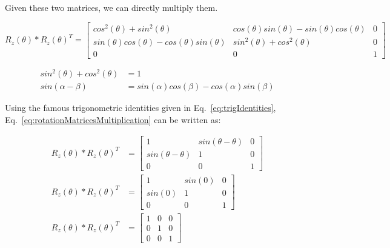 \documentclass[a4paper, twoside, english]{article}
\begin{document}
Given these two matrices, we can directly multiply them.

\begin{equation}
 R_z (\theta) * R_z (\theta)^{T} = \left[
 \begin{array}{ccc}
  cos^2(\theta) + sin^2(\theta) & cos(\theta)sin(\theta) - sin(\theta)cos(\theta) & 0 \\
  sin(\theta)cos(\theta) - cos(\theta)sin(\theta) & sin^2(\theta) + cos^2(\theta) & 0 \\
  0 & 0 & 1
 \end{array}
 \right]
 \label{eq:rotationMatricesMultiplication}
\end{equation}

\begin{equation}
 \begin{aligned}
  sin^2(\theta) + cos^2(\theta) &= 1 \\
          sin(\alpha - \beta) &= sin(\alpha)cos(\beta) - cos(\alpha)sin(\beta)
 \end{aligned}
 \label{eq:trigIdentities}
\end{equation}

Using the famous trigonometric identities given in Eq.~\ref{eq:trigIdentities}, Eq.~\ref{eq:rotationMatricesMultiplication} can be written as:

\begin{equation*}
\begin{align*}
 R_z (\theta) * R_z (\theta)^{T} &= \left[
 \begin{array}{ccc}
  1 & sin(\theta - \theta) & 0 \\
  sin(\theta - \theta) & 1 & 0 \\
  0 & 0 & 1
 \end{array}
 \right] \\
 R_z (\theta) * R_z (\theta)^{T} &= \left[
 \begin{array}{ccc}
  1 & sin(0) & 0 \\
  sin(0) & 1 & 0 \\
  0 & 0 & 1
 \end{array}
 \right] \\
 R_z (\theta) * R_z (\theta)^{T} &= \left[
 \begin{array}{ccc}
  1 & 0 & 0 \\
  0 & 1 & 0 \\
  0 & 0 & 1
 \end{array}
 \right]
 \label{eq:rotationMatricesMultiplication2}
\end{align*}
\end{equation*}
\end{document}
